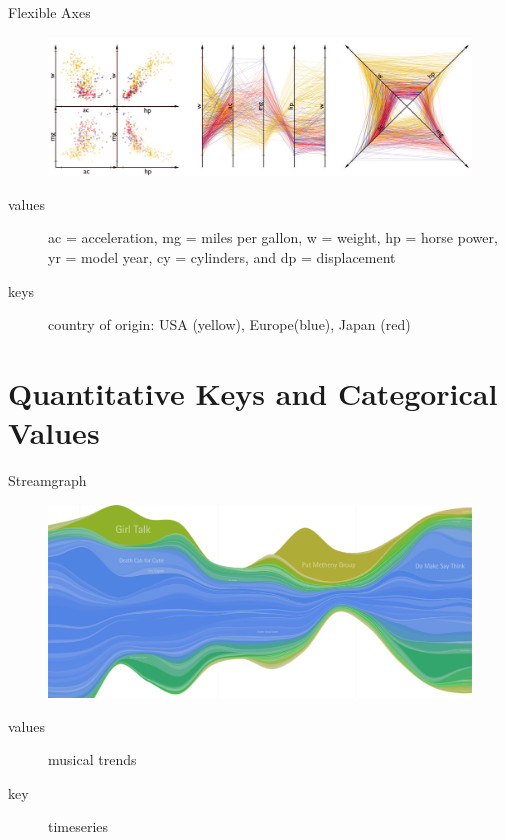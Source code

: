 \documentclass[xcolor={dvipsnames}]{beamer}
\begin{document}
\begin{frame}{Flexible Axes\cite{claessen_flexible_2011}}
\begin{figure}
\includegraphics[width=\textwidth]{figs/flexaxis.png}
\end{figure}
\begin{description}
        \item[values] ac = acceleration, mg = miles per gallon, w = weight, hp = horse power, yr = model year, cy = cylinders, and dp = displacement
        \item[keys] country of origin: USA (yellow), Europe(blue), Japan (red)
\end{description}
\end{frame}


\section{Quantitative Keys and Categorical Values}
\frame{\sectionpage}

\begin{frame}{Streamgraph\cite{byron_stacked_2008}}
\begin{figure}
\includegraphics[width=\textwidth]{figs/stream.png}
\end{figure}
\begin{description}
        \item[values] musical trends
        \item[key] timeseries
\end{description}

\end{frame}
\end{document}
